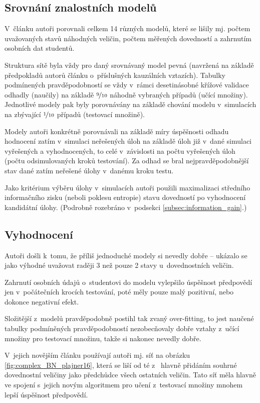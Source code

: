 \documentclass[a4paper,twoside,12pt]{scrbook}
\begin{document}
\subsection{Srovnání znalostních modelů}
V~článku autoři porovnali celkem 14 různých modelů, které se lišily mj. počtem uvažovaných stavů náhodných veličin, počtem měřených dovedností a zahrnutím osobních dat studentů.

Struktura sítě byla vždy pro daný srovnávaný model pevná (navržená na základě předpokladů autorů článku o~příslušných kauzálních vztazích). Tabulky podmínených pravděpodobností se vždy v~rámci desetinásobné křížové validace odhadly (naučily) na základě $\nicefrac{9}{10}$ náhodně vybraných případů (učící množiny). Jednotlivé modely pak byly porovnávány na základě chování modelu v~simulacích na zbývající $\nicefrac{1}{10}$ případů (testovací množině).

Modely autoři konkrétně porovnávali na základě míry úspěšnosti odhadu hodnocení zatím v~simulaci neřešených úloh na základě úloh již v~dané simulaci vyřešených a vyhodnocených, to celé v~závislosti na počtu vyřešených úloh (počtu odsimulovaných kroků testování). Za odhad se bral nejpravděpodobnější stav dané zatím neřešené úlohy v~danému kroku testu.

Jako kritérium výběru úlohy v~simulacích autoři použili maximalizaci středního informačního zisku (neboli poklesu entropie) stavu dovedností po vyhodnocení kandidátní úlohy. (Podrobně rozebráno v~podsekci \ref{subsec:information_gain}.)

\subsection{Vyhodnocení}
Autoři došli k~tomu, že příliš jednoduché modely si nevedly dobře -- ukázalo se jako výhodné uvažovat raději 3 než pouze 2 stavy u~dovednostních veličin.

Zahrnutí osobních údajů o~studentovi do modelu vylepšilo úspěšnost předpovědí jen v~počátečních krocích testování, poté měly pouze malý pozitivní, nebo dokonce negativní efekt.

Složitější z~modelů pravděpodobně postihl tak zvaný over-fitting, to jest naučené tabulky podmíněných pravděpodobností nezobecňovaly dobře vztahy z~učící množiny pro testovací množinu, takže si nakonec nevedly dobře.

V~jejich novějším článku \cite{plajner16} používají autoři mj. síť na obrázku \ref{fig:complex_BN_plajner16}, která se liší od té z~\cite{vomlel_plajner2015} hlavně přidáním souhrné dovednostní veličiny jako předchůdce všech ostatních veličin. Tato síť měla hlavně ve spojení s~jejich novým algoritmem pro učení z~testovací množiny mnohem lepší úspěšnost předpovědí.
\end{document}
